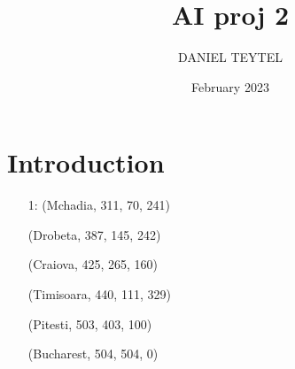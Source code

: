 \documentclass{article}
\title{AI proj 2}
\author{DANIEL TEYTEL}
\date{February 2023}
\begin{document}
\maketitle

\section{Introduction}
\begin{enumerate}
\item[1:]    
(Mchadia, 311, 70, 241)

(Drobeta, 387, 145, 242)

(Craiova, 425, 265, 160)

(Timisoara, 440, 111, 329)

(Pitesti, 503, 403, 100)

(Bucharest, 504, 504, 0)
\end{enumerate}
\end{document}
